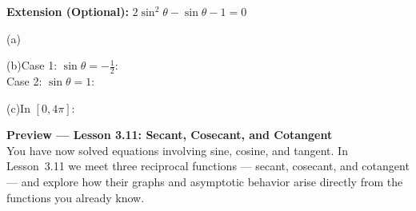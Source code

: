 \documentclass[10pt]{article}
\begin{document}
\vspace{0.08in}

\begin{extensionbox}
\textbf{Extension (Optional):} $2\sin^2\theta - \sin\theta - 1 = 0$

\vspace{4pt}
(a)\quad {}

\vspace{6pt}
(b)\quad Case 1: $\sin\theta = -\tfrac{1}{2}$: \\[4pt]
Case 2: $\sin\theta = 1$: 

\vspace{6pt}
(c)\quad In $[0, 4\pi]$: 
\end{extensionbox}

\vspace{0.08in}

\begin{tcolorbox}[colback=navylight, colframe=navy, arc=2mm,
    left=3mm, right=3mm, top=2mm, bottom=2mm]
\small\textbf{Preview --- Lesson 3.11: Secant, Cosecant, and Cotangent}\\
You have now solved equations involving sine, cosine, and tangent. In
Lesson~3.11 we meet three reciprocal functions --- secant, cosecant, and
cotangent --- and explore how their graphs and asymptotic behavior arise
directly from the functions you already know.
\end{tcolorbox}
\end{document}

